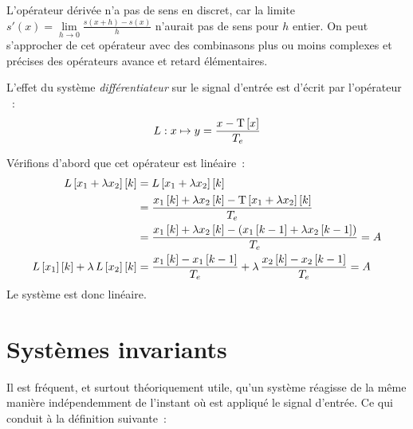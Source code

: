 L'opérateur dérivée n'a pas de sens en discret, car la limite
$s'(x)=\lim\limits_{h\to 0} \frac{s(x+h)-s(x)}{h}$ n'aurait pas de
sens pour $h$ entier. On peut s'approcher de cet opérateur avec des
combinasons plus ou moins complexes et précises des opérateurs avance
et retard élémentaires.

\begin{exemple}
  \label{exemple:differentiateur_lineaire}
  L'effet du système \emph{différentiateur} sur le signal d'entrée est
  d'écrit par l'opérateur ~:
  $$L : x \mapsto y=\frac{x-\mathrm{T}\left[x\right]}{T_e}$$
  
  Vérifions d'abord que cet opérateur est linéaire~:
  \begin{eqnarray*}
    L\left[x_1+\lambda x_2\right]\left[k\right] &= L\left[x_1+\lambda x_2\right]\left[k\right]\\
                              &= \frac{x_1\left[k\right]+\lambda x_2\left[k\right] - \mathrm{T}\left[x_1+\lambda x_2\right]\left[k\right]}{T_e}\\
                              &= \frac{x_1\left[k\right]+\lambda x_2\left[k\right] - \left(x_1\left[k-1\right]+\lambda x_2\left[k-1\right]\right)}{T_e} = A\\
    L\left[x_{1}\right]\left[k\right]+\lambda\,L\left[x_{2}\right]\left[k\right]  &= \frac{x_1\left[k\right] - x_1\left[k-1\right]}{T_e}+\lambda\,\frac{x_2\left[k\right] - x_2\left[k-1\right]}{T_e}=A
  \end{eqnarray*}
  Le système est donc linéaire.
\end{exemple}



\section{Systèmes invariants}
Il est fréquent, et surtout théoriquement utile, qu'un système
réagisse de la même manière indépendemment de l'instant où est
appliqué le signal d'entrée. Ce qui conduit à la définition suivante~:

